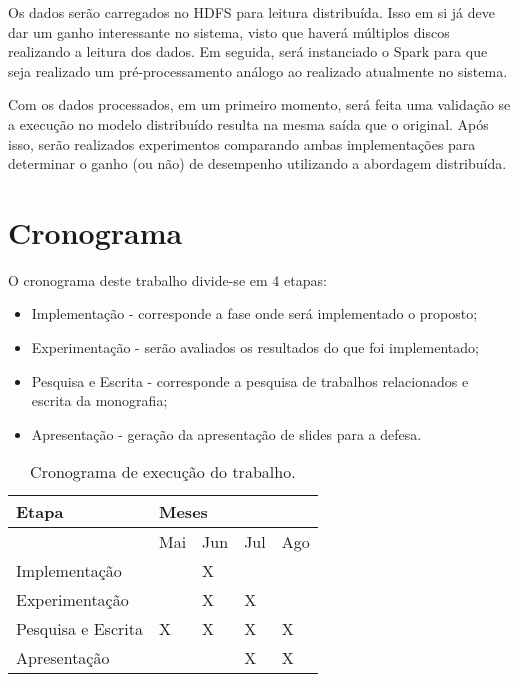 \documentclass[prop-esp]{iiufrgs}
\begin{document}
Os dados serão carregados no HDFS \cite{ref:hdfs} para leitura distribuída. Isso em si já deve dar um ganho interessante no sistema, visto que haverá múltiplos discos realizando a leitura dos dados. Em seguida, será instanciado o Spark \cite{ref:spark} para que seja realizado um pré-processamento análogo ao
realizado atualmente no sistema.

Com os dados processados, em um primeiro momento, será feita uma validação se a execução no modelo distribuído resulta na mesma saída que o original. Após isso, serão realizados experimentos comparando ambas implementações para determinar o ganho (ou não) de desempenho utilizando a abordagem distribuída.

%
\chapter{Cronograma}

O cronograma deste trabalho divide-se em 4 etapas:

\begin{itemize}
    \item Implementação - corresponde a fase onde será implementado o proposto;
    \item Experimentação - serão avaliados os resultados do que foi implementado;
    \item Pesquisa e Escrita - corresponde a pesquisa de trabalhos relacionados e escrita da monografia;
    \item Apresentação - geração da apresentação de slides para a defesa.
\end{itemize}

\begin{table}[H]
    \centering
    \begin{tabular}{|p{1.8in}|p{0.5in}|p{0.5in}|p{0.5in}|p{0.5in}|} \hline 
Etapa & \multicolumn{4}{|p{2.0in}|}{Meses} \\ \hline 
 & Mai & Jun & Jul & Ago  \\ \hline 
Implementação &  & X &  &   \\ \hline 
Experimentação &  & X & X &   \\ \hline 
Pesquisa e Escrita & X & X & X & X  \\ \hline 
Apresentação &  &  & X & X  \\ \hline 
\end{tabular}
    \caption{Cronograma de execução do trabalho.}
    \label{tab:cronog}
\end{table}



%


\end{document}
